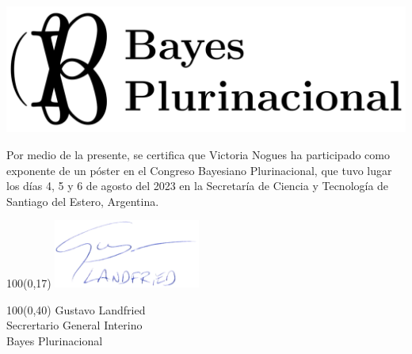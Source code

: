 \documentclass[a4paper,11pt]{letter}
\begin{document}
\begin{landscape} \centering
\includegraphics[width=14cm]{BP.pdf}

\vspace{1.75cm}


\vspace{1cm}


\LARGE
Por medio de la presente, se certifica que Victoria Nogues ha participado como exponente de un póster en el Congreso Bayesiano Plurinacional, que tuvo lugar los días 4, 5 y 6 de agosto del 2023 en la Secretaría de Ciencia y Tecnología de Santiago del Estero, Argentina.



\begin{textblock}{100}(0,17)
\phantom{.} \hfill \includegraphics[width=4.8cm]{firma.png}\hspace{2cm}\phantom{.} \\[0cm]
\end{textblock}
\begin{textblock}{100}(0,40)
 \phantom{.} \hfill Gustavo Landfried \hspace{2.5cm}\phantom{.}\\ \small
\phantom{.} \hfill Secrertario General Interino \hspace{2.5cm}\phantom{.}\\
\phantom{.} \hfill Bayes Plurinacional \hspace{2.5cm}\phantom{.}\\
\end{textblock}


\end{landscape}
\end{document}
